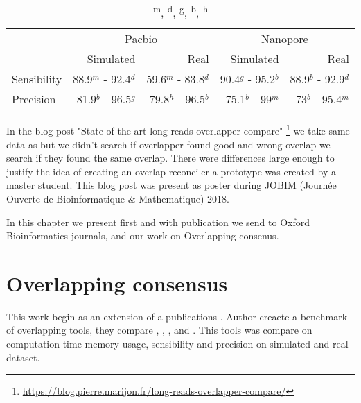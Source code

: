 \documentclass[main.tex]{subfiles}
\begin{document}
\begin{table}[ht]
    \centering
    \begin{tabular}{l|rr|rr}
                & \multicolumn{2}{c}{Pacbio}                & \multicolumn{2}{c}{Nanopore}              \\ 
                & Simulated           & Real                & Simulated         & Real                  \\ \hline
    Sensibility & 88.9$^m$ - 92.4$^d$ & 59.6$^m$ - 83.8$^d$ & 90.4$^g$ - 95.2$^b$ & 88.9$^b$ - 92.9$^d$ \\
    Precision   & 81.9$^b$ - 96.5$^g$ & 79.8$^h$ - 96.5$^b$ & 75.1$^b$ - 99$^m$   & 73$^b$ - 95.4$^m$   \\
    \end{tabular}
    \caption{\textsuperscript{m}, \textsuperscript{d}, \textsuperscript{g}, \textsuperscript{b}, \textsuperscript{h}\mhap}
    \label{preassembly:tab:ovl_result}
\end{table}

In the blog post "State-of-the-art long reads overlapper-compare" \footnote{\url{https://blog.pierre.marijon.fr/long-reads-overlapper-compare/}} we take same data as \cite{ovl_bench} but we didn't search if overlapper found good and wrong overlap we search if they found the same overlap. There were differences large enough to justify the idea of creating an overlap reconciler a prototype was created by a master student. 
This blog post was present as poster during JOBIM (Journée Ouverte de Bioinformatique \& Mathematique) 2018.

In this chapter we present first \yacrd and \fpa with publication we send to Oxford Bioinformatics journals, and our work on Overlapping consenus.



%


\section{Overlapping consensus}\label{section:preassembly:ovl_consensus}

This work begin as an extension of a \citeauthor{bench_ovl} publications \cite{bench_ovl}. Author creaete a benchmark of overlapping tools, they compare \mhap, \minimap, \cite{blasr}, \cite{daligner} and \cite{graphmap}. This tools was compare on computation time memory usage, sensibility and precision on simulated and real dataset.
\end{document}
